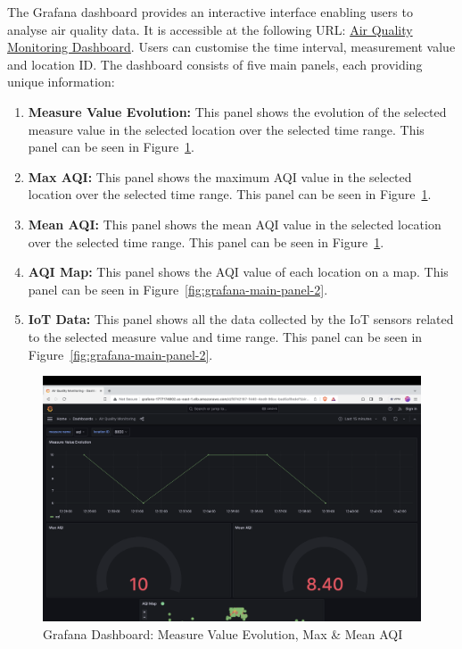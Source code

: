 \documentclass[12pt,oneside]{book} %
\begin{document}
The Grafana dashboard provides an interactive interface enabling users to
analyse air quality data. It is accessible at the following URL:
\href{http://grafana-1777174802.us-east-1.elb.amazonaws.com/d/f8742187-f440-4ee8-96cc-bad5af8edef1/air-quality-monitoring}{Air
    Quality Monitoring Dashboard}. Users can customise the time interval,
measurement value and location ID. The dashboard consists of five main panels,
each providing unique information:
\begin{enumerate}
    \item \textbf{Measure Value Evolution:} This panel shows the evolution of the selected measure value in the selected location over the selected time range. This panel can be seen in Figure~\ref{fig:grafana-main-panel-1}.
    \item \textbf{Max AQI:} This panel shows the maximum AQI value in the selected location over the selected time range. This panel can be seen in Figure~\ref{fig:grafana-main-panel-1}.
    \item \textbf{Mean AQI:} This panel shows the mean AQI value in the selected location over the selected time range. This panel can be seen in Figure~\ref{fig:grafana-main-panel-1}.
    \item \textbf{AQI Map:} This panel shows the AQI value of each location on a map. This panel can be seen in Figure~\ref{fig:grafana-main-panel-2}.
    \item \textbf{IoT Data:} This panel shows all the data collected by the IoT sensors related to the selected measure value and time range. This panel can be seen in Figure~\ref{fig:grafana-main-panel-2}.
\end{enumerate}

\begin{figure}[H]
    \centering
    \includegraphics[width=1\linewidth]{images/grafana-1.png}
    \caption{Grafana Dashboard: Measure Value Evolution, Max \& Mean AQI}\label{fig:grafana-main-panel-1}
\end{figure}
\end{document}

